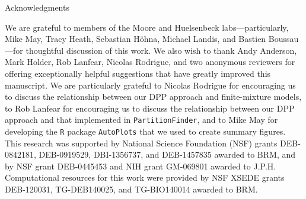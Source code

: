 \documentclass[11pt]{article}
\begin{document}
\begin{center}
{\sc Acknowledgments}
\end{center}

\noindent
We are grateful to members of the Moore and Huelsenbeck labs---particularly, Mike May, Tracy Heath, Sebastian H\"ohna, Michael Landis, and Bastien Boussau---for thoughtful discussion of this work.
We also wish to thank Andy Anderson, Mark Holder, Rob Lanfear, Nicolas Rodrigue, and two anonymous reviewers for offering exceptionally helpful suggestions that have greatly improved this manuscript. 
We are particularly grateful to Nicolas Rodrigue for encouraging us to discuss the relationship between our DPP approach and finite-mixture models, to Rob Lanfear for encouraging us to discuss the relationship between our DPP approach and that implemented in \texttt{PartitionFinder}, and to Mike May for developing the \texttt{R} package \texttt{AutoPlots} that we used to create summary figures.
This research was supported by National Science Foundation (NSF) grants DEB-0842181, DEB-0919529, DBI-1356737, and DEB-1457835 awarded to BRM, and by NSF grant DEB-0445453 and NIH grant GM-069801 awarded to J.P.H.
Computational resources for this work were provided by NSF XSEDE grants DEB-120031, TG-DEB140025, and TG-BIO140014 awarded to BRM.

\newpage

%
\end{document}
